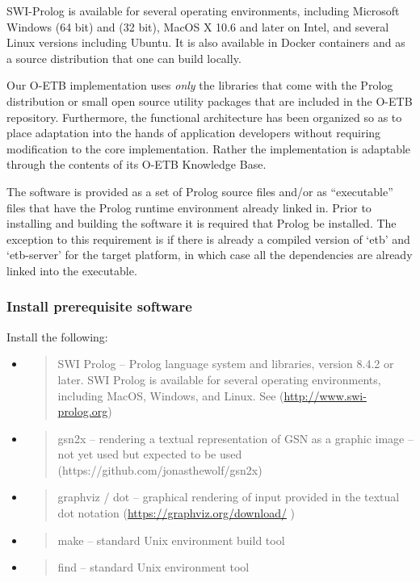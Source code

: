 \documentclass[12pt,twoside,a4paper]{article}
\begin{document}
SWI-Prolog is available for several operating environments, including Microsoft Windows (64 bit) and (32 bit), MacOS X 10.6 and later on Intel, and several Linux versions including Ubuntu. It is also available in Docker containers and as a source distribution that one can build locally.

Our O-ETB implementation uses \emph{only} the libraries that come with the Prolog distribution or small open source utility packages that are included in the O-ETB repository. Furthermore, the functional architecture has been organized so as to place adaptation into the hands of application developers without requiring modification to the core implementation. Rather the implementation is adaptable through the contents of its O-ETB Knowledge Base.

The software is provided as a set of Prolog source files and/or as ``executable'' files that have the Prolog runtime environment already linked in. Prior to installing and building the software it is required that Prolog be installed. The exception to this requirement is if there is already a compiled version of `etb' and `etb-server' for the target platform, in which case all the dependencies are already linked into the executable.

\hypertarget{install-prerequisite-software}{%
\subsubsection{\texorpdfstring{Install prerequisite software }{Install prerequisite software }}\label{install-prerequisite-software}}

Install the following:

\begin{itemize}
\item
  \begin{quote}
  SWI Prolog -- Prolog language system and libraries, version 8.4.2 or later. SWI Prolog is available for several operating environments, including MacOS, Windows, and Linux. See (\url{http://www.swi-prolog.org})
  \end{quote}
\item
  \begin{quote}
  gsn2x -- rendering a textual representation of GSN as a graphic image -- not yet used but expected to be used (https://github.com/jonasthewolf/gsn2x)
  \end{quote}
\item
  \begin{quote}
  graphviz / dot -- graphical rendering of input provided in the textual dot notation (\url{https://graphviz.org/download/} )
  \end{quote}
\item
  \begin{quote}
  make -- standard Unix environment build tool
  \end{quote}
\item
  \begin{quote}
  find -- standard Unix environment tool
  \end{quote}
\end{itemize}
\end{document}
